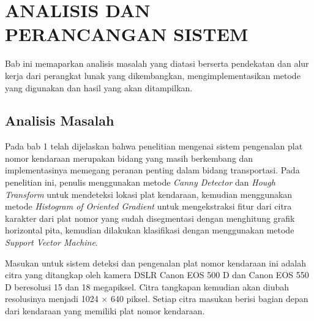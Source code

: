 \chapter{ANALISIS DAN PERANCANGAN SISTEM}

%
\vspace{4.5pt}

\noindent Bab ini memaparkan analisis masalah yang diatasi berserta pendekatan dan alur kerja dari perangkat lunak yang dikembangkan, mengimplementasikan metode yang digunakan dan hasil yang akan ditampilkan.
\\
\section{Analisis Masalah}
\noindent Pada bab 1 telah dijelaskan bahwa penelitian mengenai sistem pengenalan plat nomor kendaraan merupakan bidang yang masih berkembang dan implementasinya memegang peranan penting dalam bidang transportasi. Pada penelitian ini, penulis menggunakan metode \textit{Canny Detector} dan \textit{Hough Transform} untuk mendeteksi lokasi plat kendaraan, kemudian menggunakan metode \textit{Histogram of Oriented Gradient} untuk mengekstraksi fitur dari citra karakter dari plat nomor yang sudah disegmentasi dengan menghitung grafik horizontal pita, kemudian dilakukan klasifikasi dengan menggunakan metode \textit{Support Vector Machine}.

\noindent Masukan untuk sistem deteksi dan pengenalan plat nomor kendaraan ini adalah citra yang ditangkap oleh kamera DSLR Canon EOS 500 D dan Canon EOS 550 D beresolusi 15 dan 18 megapiksel. Citra tangkapan kemudian akan diubah resolusinya menjadi 1024 $\times$ 640 piksel. Setiap citra masukan berisi bagian depan dari kendaraan yang memiliki plat nomor kendaraan.

